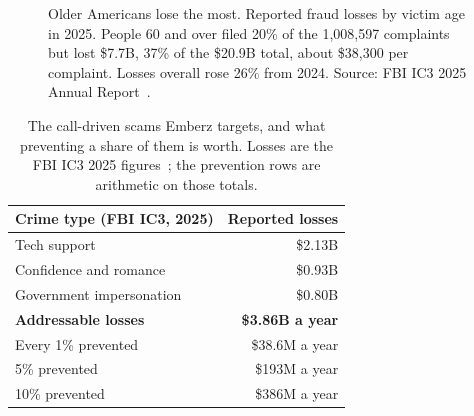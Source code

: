 \documentclass[11pt]{article}
\begin{document}
\begin{figure}[H]\centering
{}
\caption{Older Americans lose the most. Reported fraud losses by victim age in 2025. People 60 and over filed 20\% of the 1,008,597 complaints but lost \$7.7B, 37\% of the \$20.9B total, about \$38{,}300 per complaint. Losses overall rose 26\% from 2024. Source: FBI IC3 2025 Annual Report~\cite{ic3}.}\label{fig:ic3}
\end{figure}

\begin{table}[H]\centering\small
\caption{The call-driven scams Emberz targets, and what preventing a share of them is worth. Losses are the FBI IC3 2025 figures~\cite{ic3}; the prevention rows are arithmetic on those totals.}\label{tab:addressable}
\begin{tabular}{lr}\toprule
Crime type (FBI IC3, 2025) & Reported losses \\ \midrule
Tech support & \$2.13B \\
Confidence and romance & \$0.93B \\
Government impersonation & \$0.80B \\ \midrule
\textbf{Addressable losses} & \textbf{\$3.86B a year} \\ \midrule
Every 1\% prevented & \$38.6M a year \\
5\% prevented & \$193M a year \\
10\% prevented & \$386M a year \\
\bottomrule\end{tabular}\end{table}
\end{document}
